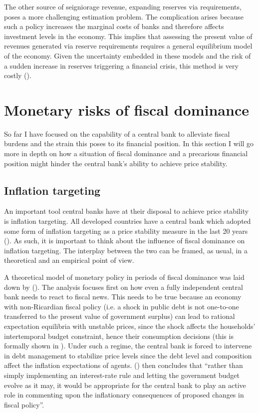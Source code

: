 \documentclass[american]{scrartcl}
\newcommand{\citein}[1]{\citeauthor{#1} (\citeyear{#1})}
\begin{document}
The other source of seigniorage revenue, expanding reserves via requirements, poses a more challenging estimation problem. The complication arises because such a policy increases the marginal costs of banks and therefore affects investment levels in the economy. This implies that assessing the present value of revenues generated via reserve requirements requires a general equilibrium model of the economy. Given the uncertainty embedded in these models and the risk of a sudden increase in reserves triggering a financial crisis, this method is very costly (\cite{Hoggarth2002}).

\section{Monetary risks of fiscal dominance}

So far I have focused on the capability of a central bank to alleviate fiscal burdens and the strain this poses to its financial position. In this section I will go more in depth on how a situation of fiscal dominance and a precarious financial position might hinder the central bank's ability to achieve price stability.

\subsection{Inflation targeting}

An important tool central banks have at their disposal to achieve price stability is inflation targeting. All developed countries have a central bank which adopted some form of inflation targeting as a price stability measure in the last 20 years (\cite{Ahmed2021}). As such, it is important to think about the influence of fiscal dominance on inflation targeting. The interplay between the two can be framed, as usual, in a theoretical and an empirical point of view.

A theoretical model of monetary policy in periods of fiscal dominance was laid down by \citein{Woodford1998}. The analysis focuses first on how even a fully independent central bank needs to react to fiscal news. This needs to be true because an economy with non-Ricardian fiscal policy (i.e. a shock in public debt is not one-to-one transferred to the present value of government surplus) can lead to rational expectation equilibria with unstable prices, since the shock affects the households' intertemporal budget constraint, hence their consumption decisions (this is formally shown in \cite[p. 123]{Woodford1998}). Under such a regime, the central bank is forced to intervene in debt management to stabilize price levels since the debt level and composition affect the inflation expectations of agents. \citein{Woodford1998} then concludes that “rather than simply implementing an interest-rate rule and letting the government budget evolve as it may, it would be appropriate for the central bank to play an active role in commenting upon the inflationary consequences of proposed changes in fiscal policy”.
\end{document}
